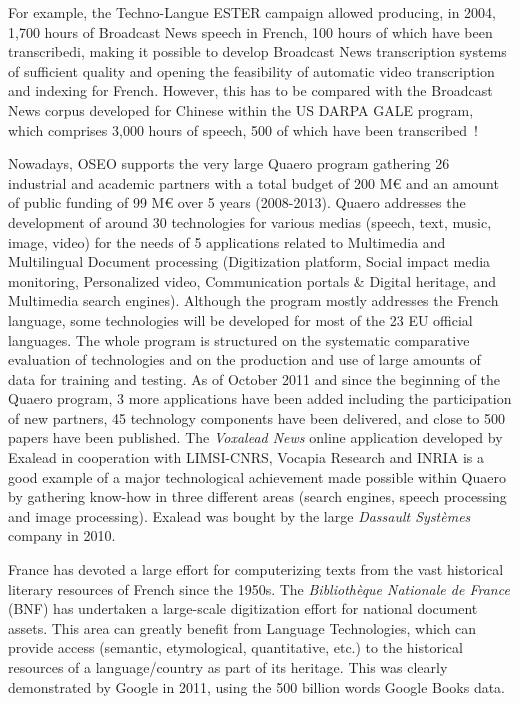 \begin{multicols}{2}
For example, the Techno-Langue ESTER campaign allowed producing, in
2004, 1,700 hours of Broadcast News speech in French, 100 hours of
which have been transcribedi, making it possible to develop Broadcast
News transcription systems of sufficient quality and opening the
feasibility of automatic video transcription and indexing for
French. However, this has to be compared with the Broadcast News
corpus developed for Chinese within the US DARPA GALE program, which
comprises 3,000 hours of speech, 500 of which have been transcribed~\cite{gale}!

Nowadays, OSEO supports the very large Quaero program gathering 26
industrial and academic partners with a total budget of 200 M€ and an
amount of public funding of 99 M€ over 5 years (2008-2013). Quaero
addresses the development of around 30 technologies for various medias
(speech, text, music, image, video) for the needs of 5 applications
related to Multimedia and Multilingual Document processing
(Digitization platform, Social impact media monitoring, Personalized
video, Communication portals \& Digital heritage, and Multimedia search
engines). Although the program mostly addresses the French language,
some technologies will be developed for most of the 23 EU official
languages. The whole program is structured on the systematic
comparative evaluation of technologies and on the production and use
of large amounts of data for training and testing. As of October 2011
and since the beginning of the Quaero program, 3 more applications
have been added including the participation of new partners, 45
technology components have been delivered, and close to 500 papers
have been published. The {\em Voxalead News} online application developed by
Exalead in cooperation with LIMSI-CNRS, Vocapia Research and INRIA is
a good example of a major technological achievement made possible
within Quaero by gathering know-how in three different areas (search
engines, speech processing and image processing). Exalead was bought
by the large {\em Dassault Systèmes} company in 2010.

France has devoted a large effort for computerizing texts from the
vast historical literary resources of French since the 1950s. The
{\em Bibliothèque Nationale de France} (BNF) has undertaken a large-scale
digitization effort for national document assets. This area can
greatly benefit from Language Technologies, which can provide access
(semantic, etymological, quantitative, etc.) to the historical
resources of a language/country as part of its heritage. This was
clearly demonstrated by Google in 2011, using the 500 billion words
Google Books data.


\end{multicols}

